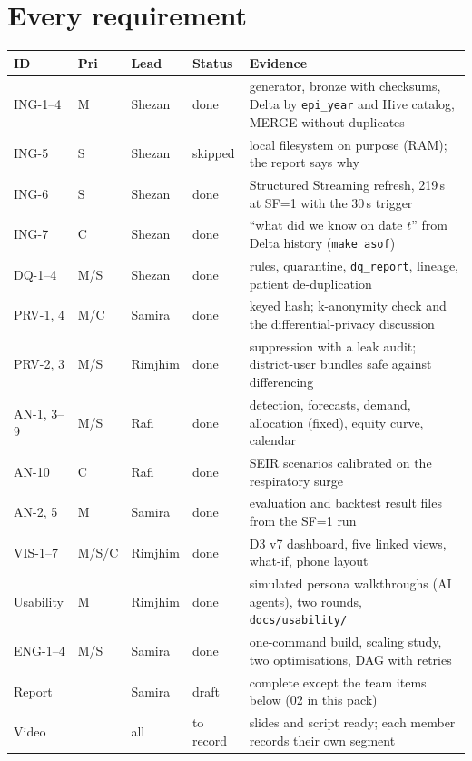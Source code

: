 \section*{Every requirement}
\small
\begin{longtable}{@{}l l l l >{\raggedright\arraybackslash}p{7.2cm}@{}}
\toprule
\textbf{ID} & \textbf{Pri} & \textbf{Lead} & \textbf{Status} & \textbf{Evidence} \\
\midrule
\endhead
ING-1--4 & M & Shezan & done & generator, bronze with checksums, Delta by \texttt{epi\_year} and Hive catalog, MERGE without duplicates \\
ING-5 & S & Shezan & skipped & local filesystem on purpose (RAM); the report says why \\
ING-6 & S & Shezan & done & Structured Streaming refresh, 219\,s at SF=1 with the 30\,s trigger \\
ING-7 & C & Shezan & done & ``what did we know on date $t$'' from Delta history (\texttt{make asof}) \\
DQ-1--4 & M/S & Shezan & done & 28 rules, quarantine, \texttt{dq\_report}, lineage, patient de-duplication \\
PRV-1, 4 & M/C & Samira & done & keyed hash; k-anonymity check and the differential-privacy discussion \\
PRV-2, 3 & M/S & Rimjhim & done & suppression with a leak audit; district-user bundles safe against differencing \\
AN-1, 3--9 & M/S & Rafi & done & detection, forecasts, demand, allocation (fixed), equity curve, calendar \\
AN-10 & C & Rafi & done & SEIR scenarios calibrated on the respiratory surge \\
AN-2, 5 & M & Samira & done & evaluation and backtest result files from the SF=1 run \\
VIS-1--7 & M/S/C & Rimjhim & done & D3 v7 dashboard, five linked views, what-if, phone layout \\
Usability & M & Rimjhim & done & simulated persona walkthroughs (AI agents), two rounds, \nolinkurl{docs/usability/} \\
ENG-1--4 & M/S & Samira & done & one-command build, scaling study, two optimisations, DAG with retries \\
Report & & Samira & draft & complete except the team items below (02 in this pack) \\
Video & & all & to record & slides and script ready; each member records their own segment \\
\bottomrule
\end{longtable}
\normalsize

